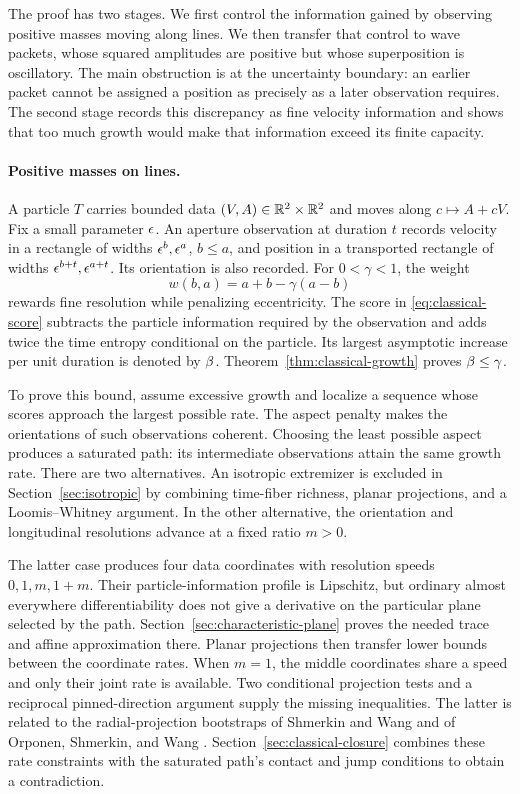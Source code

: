 The proof has two stages. We first control the information gained by
observing positive masses moving along lines. We then transfer that
control to wave packets, whose squared amplitudes are positive but
whose superposition is oscillatory. The main obstruction is at the
uncertainty boundary: an earlier packet cannot be assigned a position
as precisely as a later observation requires. The second stage records
this discrepancy as fine velocity information and shows that too much
growth would make that information exceed its finite capacity.

\paragraph{Positive masses on lines.}
A particle $T$ carries bounded data $(V,A)\in\mathbb R^2\times\mathbb R^2$ and
moves along $c\mapsto A+cV$. Fix a small parameter $\epsilon$.
An aperture observation at duration $t$ records velocity in a
rectangle of widths $\epsilon^b,\epsilon^a$, $b\le a$, and position in
a transported rectangle of widths $\epsilon^{b+t},\epsilon^{a+t}$.
Its orientation is also recorded. For $0<\gamma<1$, the weight
\[
 w(b,a)=a+b-\gamma(a-b)
\]
rewards fine resolution while penalizing eccentricity. The score in
\eqref{eq:classical-score} subtracts the particle information required
by the observation and adds twice the time entropy conditional on the
particle. Its largest asymptotic increase per unit duration is denoted
by $\beta$. Theorem~\ref{thm:classical-growth} proves
$\beta\le\gamma$.

To prove this bound, assume excessive growth and localize a sequence
whose scores approach the largest possible rate. The aspect penalty
makes the orientations of such observations coherent. Choosing the
least possible aspect produces a saturated path: its intermediate
observations attain the same growth rate. There are two alternatives.
An isotropic extremizer is excluded in Section~\ref{sec:isotropic} by
combining time-fiber richness, planar projections, and a
Loomis--Whitney argument. In the other alternative, the orientation
and longitudinal resolutions advance at a fixed ratio $m>0$.

The latter case produces four data coordinates with resolution speeds
$0,1,m,1+m$. Their particle-information profile is Lipschitz, but ordinary almost
everywhere differentiability does not give a derivative on the
particular plane selected by the path. Section~\ref{sec:characteristic-plane}
proves the needed trace and affine approximation there.
Planar projections then transfer lower bounds between the coordinate
rates. When $m=1$, the middle coordinates share a speed and only
their joint rate is available. Two conditional projection tests and a
reciprocal pinned-direction argument supply the missing inequalities.
The latter is related to the radial-projection bootstraps of Shmerkin
and Wang and of Orponen, Shmerkin, and Wang
\citep{ShmerkinWang2025Distance,OrponenShmerkinWang2024Radial}.
Section~\ref{sec:classical-closure} combines these rate constraints
with the saturated path's contact and jump conditions to obtain a
contradiction.

